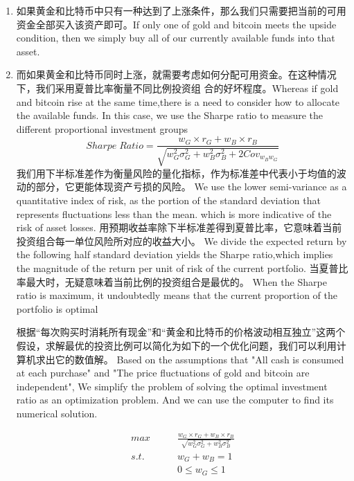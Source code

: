 \documentclass{mcmthesis}
\begin{document}
\begin{enumerate}
  \item 如果黄金和比特币中只有一种达到了上涨条件，那么我们只需要把当前的可用资金全部买入该资产即可。If only one of gold and bitcoin meets the upside condition, then we simply buy all of our currently available funds into that asset.
  \item 而如果黄金和比特币同时上涨，就需要考虑如何分配可用资金。在这种情况下，我们采用夏普比率衡量不同比例投资组
  合的好坏程度。Whereas if gold and bitcoin rise at the same time,there is a need to consider how to allocate the available funds. 
  In this case, we use the Sharpe ratio to measure the different proportional investment groups
$$ Sharpe \; Ratio=\frac{w_G\times r_G+w_B\times r_B}{\sqrt{w_G^2 \sigma _G^2 + w_B^2 \sigma _B^2+2Cov_{w_B w_G}}}$$
  我们用下半标准差作为衡量风险的量化指标，作为标准差中代表小于均值的波动的部分，它更能体现资产亏损的风险。
We use the lower semi-variance as a quantitative index of risk, as the portion of the standard deviation that represents fluctuations less than the mean.
which is more indicative of the risk of asset losses.
  用预期收益率除下半标准差得到夏普比率，它意味着当前投资组合每一单位风险所对应的收益大小。
We divide the expected return by the following half standard deviation yields the Sharpe ratio,which implies the magnitude of the return per unit of risk of the current portfolio.
  当夏普比率最大时，无疑意味着当前比例的投资组合是最优的。
When the Sharpe ratio is maximum, it undoubtedly means that the current proportion of the portfolio is optimal

  根据“每次购买时消耗所有现金”和“黄金和比特币的价格波动相互独立”这两个假设，求解最优的投资比例可以简化为如下的一个优化问题，我们可以利用计算机求出它的数值解。
Based on the assumptions that "All cash is consumed at each purchase" and "The price fluctuations of gold and bitcoin are independent", 
We simplify the problem of solving the optimal investment ratio as an optimization problem.
And we can use the computer to find its numerical solution.

\begin{align*}
  max \qquad & \frac{w_G\times r_G+w_B\times r_B}{\sqrt{w_G^2 \sigma _G^2 + w_B^2 \sigma _B^2}}\\
  s.t. \quad & w_G+w_B=1\\
  & 0 \le w_G \le 1 \\
\end{align*}
\end{enumerate}
\end{document}
